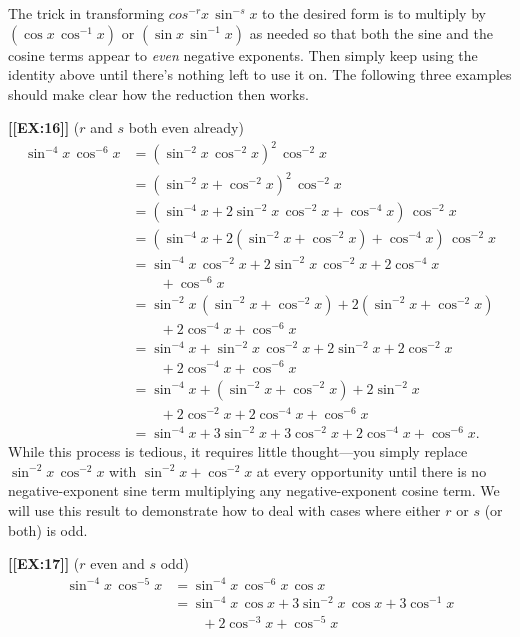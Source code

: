 The trick in transforming $cos^{-r}{x}\,\sin^{-s}{x}$ to the desired
form is to multiply by $(\cos{x}\,\cos^{-1}{x})$ or
$(\sin{x}\,\sin^{-1}{x})$ as needed so that both the sine and the
cosine terms appear to {\em even} negative exponents.  Then simply
keep using the identity above until there's nothing left to use it
on. The following three examples should make clear how the reduction
then works.





{\bf [[EX:16]]} \quad($r$ and $s$ both even already)
\begin{align*}
\sin^{-4}{x}\,\cos^{-6}{x}
  &= \left( \sin^{-2}{x}\,\cos^{-2}{x}\right)^2\,\cos^{-2}{x} \\
  &= \left( \sin^{-2}{x}+\cos^{-2}{x}\right)^2\,\cos^{-2}{x} \\
  &= (\sin^{-4}{x}+2\sin^{-2}{x}\,\cos^{-2}{x}+\cos^{-4}{x})\,\cos^{-2}{x} \\
  &= (\sin^{-4}{x}+2(\sin^{-2}{x}+\cos^{-2}{x})+\cos^{-4}{x})\,\cos^{-2}{x} \\
  &= \sin^{-4}{x}\,\cos^{-2}{x}+2\sin^{-2}{x}\,\cos^{-2}{x}+2\cos^{-4}{x} \\
  & \mbox{}\qquad +\cos^{-6}{x} \\
  &= \sin^{-2}{x}\,(\sin^{-2}{x}+\cos^{-2}{x})+2(\sin^{-2}{x}+\cos^{-2}{x}) \\
  & \mbox{}\qquad +2\cos^{-4}{x}+\cos^{-6}{x} \\
  &= \sin^{-4}{x}+\sin^{-2}{x}\,\cos^{-2}{x}+2\sin^{-2}{x}+2\cos^{-2}{x} \\
  & \mbox{}\qquad +2\cos^{-4}{x}+\cos^{-6}{x} \\
  &= \sin^{-4}{x}+( \sin^{-2}{x}+\cos^{-2}{x}) +2\sin^{-2}{x} \\
  & \mbox{}\qquad + 2\cos^{-2}{x}+ 2\cos^{-4}{x}+ \cos^{-6}{x} \\
  &= \sin^{-4}{x}+3\sin^{-2}{x}+ 3\cos^{-2}{x}+2\cos^{-4}{x}+ \cos^{-6}{x}.
\end{align*}
While this process is tedious, it requires little thought---you simply
replace $\sin^{-2}{x}\,\cos^{-2}{x}$ with $\sin^{-2}{x}+\cos^{-2}{x}$
at every opportunity until there is no negative-exponent sine term
multiplying any negative-exponent cosine term.  We will use this
result to demonstrate how to deal with cases where either $r$ or $s$
(or both) is odd.






{\bf [[EX:17]]} \quad($r$ even and $s$ odd)\label{ex17}
\begin{align*}
\sin^{-4}{x}\,\cos^{-5}{x}
  &= \sin^{-4}{x}\,\cos^{-6}{x}\,\cos{x} \\
  &= \sin^{-4}{x}\,\cos{x}+3\sin^{-2}{x}\,\cos{x}+ 3\cos^{-1}{x} \\
  &  \mbox{}\qquad +2\cos^{-3}{x}+ \cos^{-5}{x}
\end{align*}





